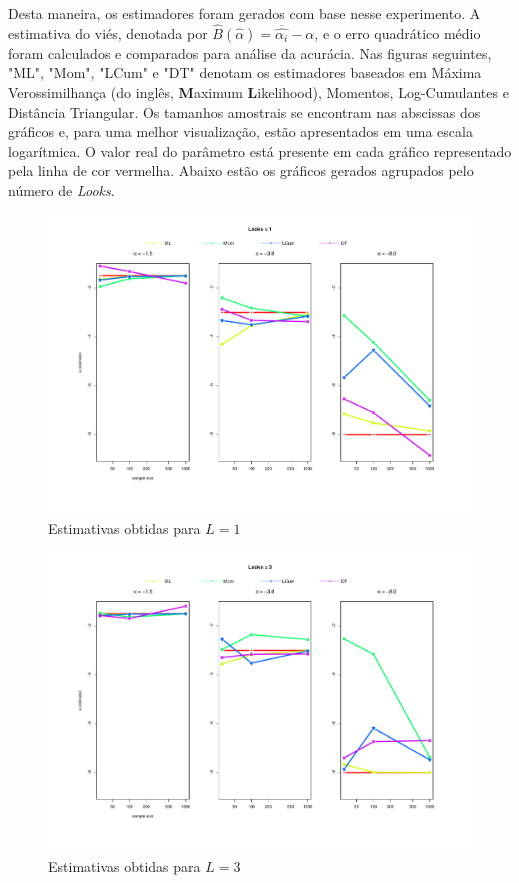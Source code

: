 Desta maneira, os estimadores foram gerados com base nesse experimento. A estimativa do viés, denotada por $\widehat{B}(\widehat{\alpha}) = \overline{\widehat{\alpha_i}} - \alpha$, 
e o erro quadrático médio foram calculados e comparados para análise da acurácia. Nas figuras seguintes, "ML", "Mom", "LCum" e "DT" denotam os estimadores baseados em Máxima Verossimilhança (do inglês, \textbf{M}aximum \textbf{L}ikelihood), Momentos, Log-Cumulantes e Distância Triangular. Os tamanhos amostrais se encontram nas abscissas dos gráficos e, para uma melhor visualização, estão apresentados em uma escala logarítmica. O valor real do parâmetro está presente em cada gráfico representado pela linha de cor vermelha. Abaixo estão os gráficos gerados agrupados pelo número de \textit{Looks}.
\begin{figure}[H]
     \centering
     \includegraphics[scale=0.5]{plots/estimators_L=1.pdf}
     \caption{Estimativas obtidas para $L=1$}
     \label{graf_8}
\end{figure}
\begin{figure}[H]
     \centering
     \includegraphics[scale=0.5]{plots/estimators_L=3.pdf}
     \caption{Estimativas obtidas para $L=3$}
     \label{graf_9}
\end{figure}
